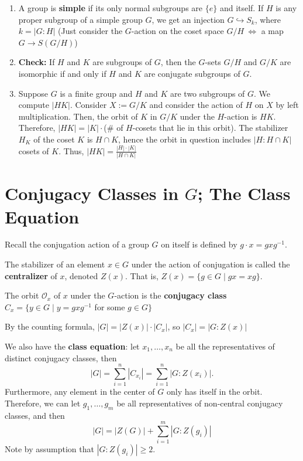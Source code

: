 \begin{ex}
    \begin{enumerate}
        \item A group is \textbf{simple} if its only normal subgroups are $\{e\}$ and itself. If $H$ is any proper subgroup of a simple group $G$, we get an injection $G \hookrightarrow S_k$, where $k = |G:H|$ (Just consider the $G$-action on the coset space $G/H \ \iff$ a map $G \to S(G/H)$)
        \item \textbf{Check:} If $H$ and $K$ are subgroups of $G$, then the $G$-sets $G/H$ and $G/K$ are isomorphic if and only if $H$ and $K$ are conjugate subgroups of $G$.
        \item Suppose $G$ is a finite group and $H$ and $K$ are two subgroups of $G$. We compute $|HK|$. Consider $X := G/K$ and consider the action of $H$ on $X$ by left multiplication. Then, the orbit of $K$ in $G/K$ under the $H$-action is $HK$. Therefore, $|HK| = |K| \cdot$(\# of $H$-cosets that lie in this orbit). The stabilizer $H_K$ of the coset $K$ is $H \cap K$, hence the orbit in question includes $|H:H \cap K|$ cosets of $K$. Thus, $|HK| = \frac{|H| \cdot |K|}{|H \cap K|}$
    \end{enumerate}
\end{ex}

\section{\texorpdfstring{Conjugacy Classes in $G$; The Class Equation}{Conjugacy Classes in G; The Class Equation}}
Recall the conjugation action of a group $G$ on itself is defined by $g \cdot x = gxg^{-1}$.
\begin{defn}
    The stabilizer of an element $x \in G$ under the action of conjugation is called the \textbf{centralizer} of $x$, denoted $Z(x)$. That is, $Z(x)=\{ g \in G \mid gx=xg\}$.
\end{defn}

\begin{defn}
    The orbit $\mathcal O _x$ of $x$ under the $G$-action is the \textbf{conjugacy class} $C_x=\{ y \in G \mid y= gxg^{-1}$ for some $g \in G \}$
\end{defn}

\begin{prop}
    By the counting formula, $|G| = |Z(x)| \cdot |C_x|$, so $|C_x| = |G:Z(x)|$

    We also have the \textbf{class equation}: let $x_1,\dots,x_n$ be all the representatives of distinct conjugacy classes, then
    $$|G| = \sum_{i=1}^n|C_{x_i}|=\sum_{i=1}^n|G:Z(x_i)|.$$
    Furthermore, any element in the center of $G$ only has itself in the orbit. Therefore, we can let $g_1,\dots,g_m$ be all representatives of non-central conjugacy classes, and then
    $$|G|=|Z(G)|+\sum_{i=1}^m|G:Z(g_i)|$$
    Note by assumption that $|G:Z(g_i)|\geq 2$.
\end{prop}

